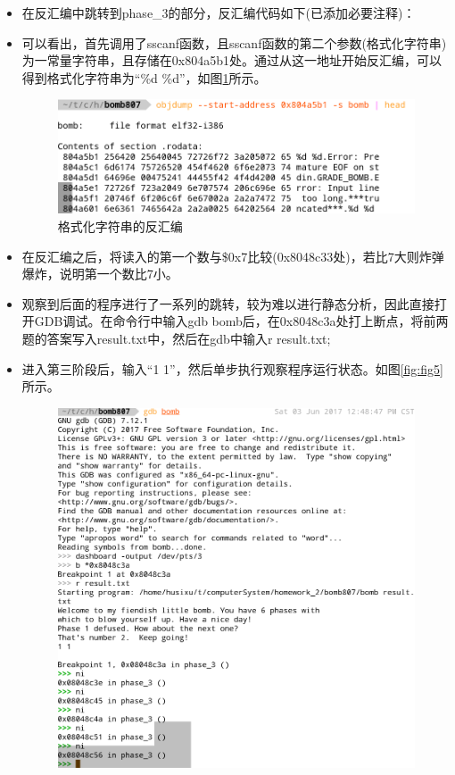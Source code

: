 \begin{itemize}
	\item 在反汇编中跳转到phase\_3的部分，反汇编代码如下(已添加必要注释)：
		\begin{codeFont}
			
		\end{codeFont}
	\item 可以看出，首先调用了sscanf函数，且sscanf函数的第二个参数(格式化字符串)为一常量字符串，且存储在0x804a5b1处。通过从这一地址开始反汇编，可以得到格式化字符串为``\%d \%d''，如图\ref{fig:fig4}所示。
		\begin{figure}[H]
			\centering
			\includegraphics[width=0.95\linewidth]{resources/fig4.png}
			\caption{格式化字符串的反汇编}
			\label{fig:fig4}
		\end{figure}
	\item 在反汇编之后，将读入的第一个数与\$0x7比较(0x8048c33处)，若比7大则炸弹爆炸，说明第一个数比7小。
	\item 观察到后面的程序进行了一系列的跳转，较为难以进行静态分析，因此直接打开GDB调试。在命令行中输入gdb bomb后，在0x8048c3a处打上断点，将前两题的答案写入result.txt中，然后在gdb中输入r result.txt;
	\item 进入第三阶段后，输入``1 1''，然后单步执行观察程序运行状态。如图\ref{fig:fig5}所示。
		\begin{figure}[H]
			\centering
			\includegraphics[width=0.95\linewidth]{resources/fig5.png}

\end{figure}
\end{itemize}
